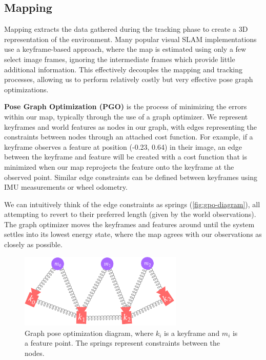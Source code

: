 \subsection{Mapping}
\label{sec:visual-slam-mapping}
Mapping extracts the data gathered during the tracking phase to create a 3D representation of the environment. Many popular visual SLAM implementations use a keyframe-based approach, where the map is estimated using only a few select image frames, ignoring the intermediate frames which provide little additional information. This effectively decouples the mapping and tracking processes, allowing us to perform relatively costly but very effective pose graph optimizations.

\textbf{Pose Graph Optimization (PGO)} is the process of minimizing the errors within our map, typically through the use of a graph optimizer. We represent keyframes and world features as nodes in our graph, with edges representing the constraints between nodes through an attached cost function. For example, if a keyframe observes a feature at position (-0.23, 0.64) in their image, an edge between the keyframe and feature will be created with a cost function that is minimized when our map reprojects the feature onto the keyframe at the observed point. Similar edge constraints can be defined between keyframes using IMU measurements or wheel odometry.

We can intuitively think of the edge constraints as springs (\autoref{fig:gpo-diagram}), all attempting to revert to their preferred length (given by the world observations). The graph optimizer moves the keyframes and features around until the system settles into its lowest energy state, where the map agrees with our observations as closely as possible.

\begin{figure}[h]
    \centering
    \begin{minipage}[t]{0.6\textwidth}
        \centering
        \includegraphics[height=1.4in]{figures/gpo_diagram.pdf}
        \caption{Graph pose optimization diagram, where $k_i$ is a keyframe and $m_i$ is a feature point. The springs represent constraints between the nodes.}
        \label{fig:gpo-diagram}
    \end{minipage}%
\end{figure}

